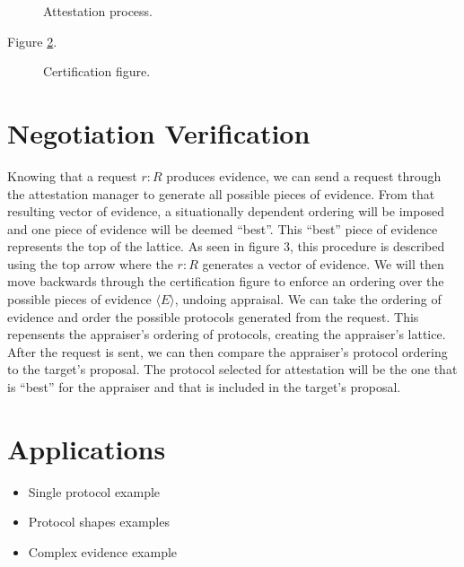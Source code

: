 \documentclass[sigconf,authordraft]{acmart}
\begin{document}
\begin{figure}[hbtp]
  \centering 
  \caption[Attestation process]{Attestation process.}
  \label{fig:sequence-fig}
\end{figure}

Figure \ref{fig:certification-fig}.

\begin{figure}[hbtp]
  \centering 
  \caption[Attestation process]{Certification figure.}
  \label{fig:certification-fig}
\end{figure}

 

\section{Negotiation Verification}

Knowing that a request $r:R$ produces evidence, we can send a request
through the attestation manager to generate all possible pieces of
evidence. From that resulting vector of evidence, a situationally
dependent ordering will be imposed and one piece of evidence will be
deemed ``best''. This ``best'' piece of evidence represents the top of
the lattice. As seen in figure 3, this procedure is described using
the top arrow where the $r:R$ generates a vector of evidence. We will
then move backwards through the certification figure to enforce an
ordering over the possible pieces of evidence $\langle E \rangle$,
undoing appraisal. We can take the ordering of evidence and order the
possible protocols generated from the request. This repensents the
appraiser's ordering of protocols, creating the appraiser's
lattice. After the request is sent, we can then compare the
appraiser's protocol ordering to the target's proposal. The protocol
selected for attestation will be the one that is ``best'' for the
appraiser and that is included in the target's proposal.

\section{Applications}

\begin{itemize}
\item Single protocol example
\item Protocol shapes examples
\item Complex evidence example

\end{itemize}
\end{document}
